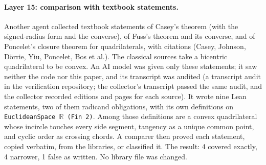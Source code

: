 \documentclass[11pt]{article}
\theoremstyle{definition}
\theoremstyle{remark}
\newcommand{\code}[1]{\texttt{#1}}
\begin{document}
\paragraph{Layer 15: comparison with textbook statements.}
Another agent collected textbook statements of Casey's theorem (with the signed-radius form and the
converse), of Fuss's theorem and its converse, and of Poncelet's closure theorem for quadrilaterals,
with citations (Casey, Johnson, Dörrie, Yiu, Poncelet, Bos et al.). The classical sources take a
bicentric quadrilateral to be convex. An AI model was given only these statements; it saw neither the
code nor this paper, and its transcript was audited (a transcript audit in the verification repository; the
collector's transcript passed the same audit, and the collector recorded editions and pages for each source). It wrote nine Lean statements, two of them
radicand obligations, with its own definitions on \code{EuclideanSpace $\mathbb{R}$ (Fin 2)}. Among
those definitions are a convex quadrilateral whose incircle touches every side segment, tangency as a
unique common point, and cyclic order as crossing chords. A comparer then proved each statement,
copied verbatim, from the libraries, or classified it. The result: 4 covered exactly, 4 narrower,
1 false as written. No library file was changed.
\end{document}
